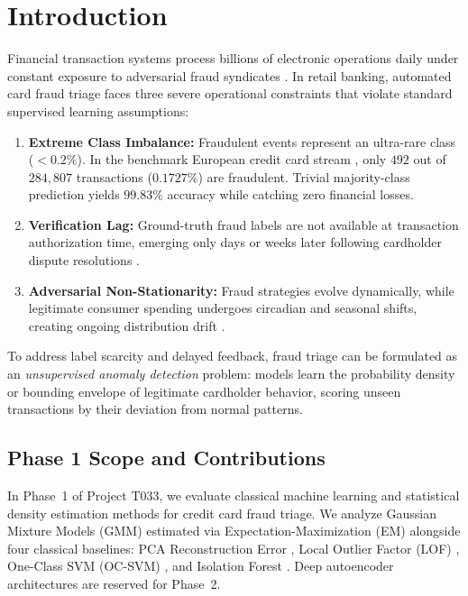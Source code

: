 \section{Introduction}
\label{sec:introduction}

Financial transaction systems process billions of electronic operations daily under constant exposure to adversarial fraud syndicates \cite{leborgne2022handbook}. In retail banking, automated card fraud triage faces three severe operational constraints that violate standard supervised learning assumptions:
\begin{enumerate}
    \item \textbf{Extreme Class Imbalance:} Fraudulent events represent an ultra-rare class ($<0.2\%$). In the benchmark European credit card stream \cite{dalpozzolo2018credit}, only $492$ out of $284,807$ transactions ($0.1727\%$) are fraudulent. Trivial majority-class prediction yields $99.83\%$ accuracy while catching zero financial losses.
    \item \textbf{Verification Lag:} Ground-truth fraud labels are not available at transaction authorization time, emerging only days or weeks later following cardholder dispute resolutions \cite{carcillo2018scarff}.
    \item \textbf{Adversarial Non-Stationarity:} Fraud strategies evolve dynamically, while legitimate consumer spending undergoes circadian and seasonal shifts, creating ongoing distribution drift \cite{dalpozzolo2015calibrating}.
\end{enumerate}

To address label scarcity and delayed feedback, fraud triage can be formulated as an \emph{unsupervised anomaly detection} problem: models learn the probability density or bounding envelope of legitimate cardholder behavior, scoring unseen transactions by their deviation from normal patterns.

\subsection{Phase 1 Scope and Contributions}
In Phase~1 of Project T033, we evaluate classical machine learning and statistical density estimation methods for credit card fraud triage. We analyze Gaussian Mixture Models (GMM) estimated via Expectation-Maximization (EM) \cite{dempster1977maximum} alongside four classical baselines: PCA Reconstruction Error \cite{shyu2003novel}, Local Outlier Factor (LOF) \cite{breunig2000lof}, One-Class SVM (OC-SVM) \cite{scholkopf2001estimating}, and Isolation Forest \cite{liu2008isolation}. Deep autoencoder architectures are reserved for Phase~2.

